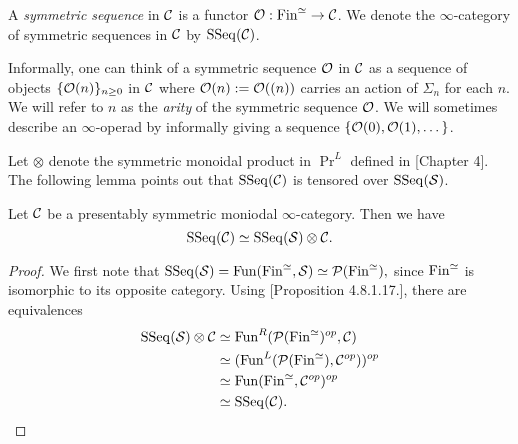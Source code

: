 \begin{definition}
	A \emph{symmetric sequence} in ${\mathcal{C}}$ is a functor ${\mathcal{O}}:\operatorname{Fin}^{\simeq} \to {\mathcal{C}}$. We denote the $\infty$-category of symmetric sequences in ${\mathcal{C}}$ by $\operatorname{SSeq}({\mathcal{C}})$.
\end{definition}
\begin{remark}
	Informally, one can think of a symmetric sequence ${\mathcal{O}}$ in ${\mathcal{C}}$ as a sequence of objects $\{{\mathcal{O}}(n)\}_{n\geq 0}$ in ${\mathcal{C}}$ where ${\mathcal{O}}(n):= {\mathcal{O}}((n))$ carries an action of $\Sigma_n$ for each $n$.
	We will refer to $n$ as the \emph{arity} of the symmetric sequence ${\mathcal{O}}$. We will sometimes describe an $\infty$-operad by informally giving a sequence $\{{\mathcal{O}}(0), {\mathcal{O}}(1), \dots \}$.
	
\end{remark}
Let $\otimes$ denote the symmetric monoidal product in $\Pr^L$ defined in \cite{HA}[Chapter 4]. The following lemma points out that 
	$\operatorname{SSeq}({\mathcal{C}})$ is tensored over $\operatorname{SSeq}(\operatorname{\mathcal{S}})$.
\begin{lemma}
	 Let ${\mathcal{C}}$ be a presentably symmetric moniodal $\infty$-category.
	Then we have 
	$$
	\operatorname{SSeq}({\mathcal{C}}) \simeq \operatorname{SSeq}(\operatorname{\mathcal{S}})\otimes {\mathcal{C}}.
	$$
\end{lemma}
\begin{proof}
We first note that 
$
\operatorname{SSeq}(\operatorname{\mathcal{S}})=\operatorname{Fun}(\operatorname{Fin}^{\simeq}, \operatorname{\mathcal{S}})\simeq {\mathcal{P}}(\operatorname{Fin}^{\simeq}),
$
since $\operatorname{Fin}^{\simeq}$ is isomorphic to its opposite category.
Using \cite{HA}[Proposition 4.8.1.17.], there are equivalences
\begin{align*}
	\operatorname{SSeq}(\operatorname{\mathcal{S}})\otimes {\mathcal{C}} 
& \simeq 
\operatorname{Fun}^R({\mathcal{P}}(\operatorname{Fin}^{\simeq})^{op},{\mathcal{C}})\\
&\simeq
(\operatorname{Fun}^{L}({\mathcal{P}}(\operatorname{Fin}^{\simeq}), {\mathcal{C}}^{op}))^{op}\\
& \simeq
\operatorname{Fun}(\operatorname{Fin}^{\simeq},{\mathcal{C}}^{op}) ^{op}\\
& \simeq \operatorname{SSeq}({\mathcal{C}}).
\end{align*}



\end{proof}

%

